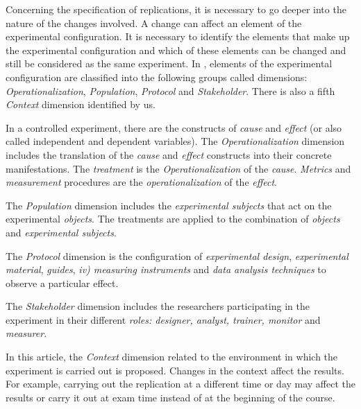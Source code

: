 
Concerning the specification of replications, it is necessary to go deeper into the nature of the changes involved. 
A change can affect an element of the experimental configuration. It is necessary to identify the elements that make up the experimental configuration and which of these elements can be changed and still be considered as the same experiment.
In \cite{gomez2014understanding}, elements of the experimental configuration are classified into the following groups called dimensions: \textit{Operationalization}, \textit{Population}, \textit{Protocol} and \textit{Stakeholder}. 
There is also a fifth \emph{Context} dimension identified by us.

In a controlled experiment, there are the constructs of \emph{cause} and \emph{effect} (or also called independent and dependent variables).
The \textit{Operationalization} dimension includes the translation of the \emph{cause} and \emph{effect} constructs into their concrete manifestations.
The \emph{treatment} is the \textit{Operationalization} of the \emph{cause}.
\emph{Metrics} and \emph{measurement} procedures are the \emph{operationalization} of the \emph{effect}.

The \emph{Population} dimension includes the \emph{experimental subjects} that act on the experimental \emph{objects}. 
The treatments are applied to the combination of \emph{objects} and \emph{experimental subjects}.

The \emph{Protocol} dimension is the configuration of \emph{experimental design}, \emph{experimental material}, \emph{guides}, \emph{iv) measuring instruments} and \emph{data analysis techniques} to observe a particular effect.

The \emph{Stakeholder} dimension includes the researchers participating in the experiment in their different \emph{roles: designer, analyst, trainer, monitor} and \emph{ measurer}.

In this article, the \emph{Context} dimension related to the environment in which the experiment is carried out is proposed. Changes in the context affect the results.
For example, carrying out the replication at a different time or day may affect the results or carry it out at exam time instead of at the beginning of the course. 

